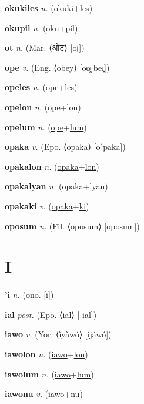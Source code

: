 \textbf{\hypertarget{okukiles}{okukiles}} \textit{n.} (\hyperlink{okuki}{okuki}+\allowbreak \hyperlink{les}{les})


\textbf{\hypertarget{okupil}{okupil}} \textit{n.} (\hyperlink{oku}{oku}+\allowbreak \hyperlink{pil}{pil})


\textbf{\hypertarget{ot}{ot}} \textit{n.} (Mar. ⟨{\devanagari{}ओट}⟩ [oʈ])


\textbf{\hypertarget{ope}{ope}} \textit{v.} (Eng. ⟨obey⟩ [oʊ̯ˈbeɪ̯])


\textbf{\hypertarget{opeles}{opeles}} \textit{n.} (\hyperlink{ope}{ope}+\allowbreak \hyperlink{les}{les})


\textbf{\hypertarget{opelon}{opelon}} \textit{n.} (\hyperlink{ope}{ope}+\allowbreak \hyperlink{lon}{lon})


\textbf{\hypertarget{opelum}{opelum}} \textit{n.} (\hyperlink{ope}{ope}+\allowbreak \hyperlink{lum}{lum})


\textbf{\hypertarget{opaka}{opaka}} \textit{v.} (Epo. ⟨opaka⟩ [oˈpaka])


\textbf{\hypertarget{opakalon}{opakalon}} \textit{n.} (\hyperlink{opaka}{opaka}+\allowbreak \hyperlink{lon}{lon})


\textbf{\hypertarget{opakalyan}{opakalyan}} \textit{n.} (\hyperlink{opaka}{opaka}+\allowbreak \hyperlink{lyan}{lyan})


\textbf{\hypertarget{opakaki}{opakaki}} \textit{v.} (\hyperlink{opaka}{opaka}+\allowbreak \hyperlink{ki}{ki})


\textbf{\hypertarget{oposum}{oposum}} \textit{n.} (Fil. ⟨oposum⟩ [oposum])


\section{I}

\textbf{\hypertarget{'i}{'i}} \textit{n.} (ono. [i])


\textbf{\hypertarget{ial}{ial}} \textit{post.} (Epo. ⟨ial⟩ [ˈial])


\textbf{\hypertarget{iawo}{iawo}} \textit{v.} (Yor. ⟨ìyàwó⟩ [ìjáwó])


\textbf{\hypertarget{iawolon}{iawolon}} \textit{n.} (\hyperlink{iawo}{iawo}+\allowbreak \hyperlink{lon}{lon})


\textbf{\hypertarget{iawolum}{iawolum}} \textit{n.} (\hyperlink{iawo}{iawo}+\allowbreak \hyperlink{lum}{lum})


\textbf{\hypertarget{iawonu}{iawonu}} \textit{v.} (\hyperlink{iawo}{iawo}+\allowbreak \hyperlink{nu}{nu})



